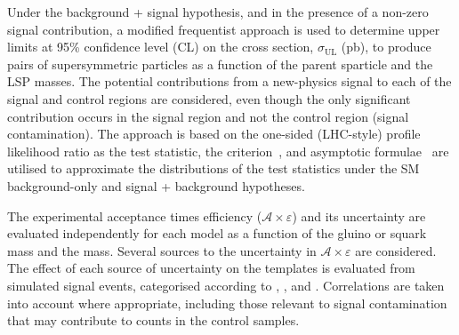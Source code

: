 Under the background + signal hypothesis, and in the presence of a
non-zero signal contribution, a modified frequentist approach is used
to determine upper limits at 95\% confidence level (CL) on the cross
section, $\sigma_\text{UL}$ (pb), to produce pairs of supersymmetric
particles as a function of the parent sparticle and the LSP
masses. The potential contributions from a new-physics signal to each
of the signal and control regions are considered, even though the only
significant contribution occurs in the signal region and not the
control region (\ie signal contamination). The approach is based on
the one-sided (LHC-style) profile likelihood ratio as the test
statistic, the \cls criterion~\cite{junk, read}, and asymptotic
formulae~\cite{Cowan:2010js} are utilised to approximate the
distributions of the test statistics under the SM background-only and
signal + background hypotheses. 

The experimental acceptance times efficiency
($\mathcal{A}\times\varepsilon$) and its uncertainty are evaluated
independently for each model as a function of the gluino or squark
mass and the \chiz mass. Several sources to the uncertainty in
$\mathcal{A}\times\varepsilon$ are considered. The effect of each
source of uncertainty on the \mht templates is evaluated from
simulated signal events, categorised according to \njet, \nb, and
\scalht. Correlations are taken into account where appropriate,
including those relevant to signal contamination that may contribute
to counts in the control samples.


